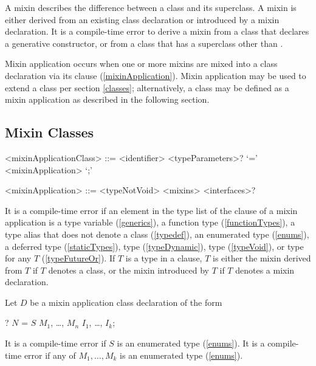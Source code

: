 \documentclass[makeidx]{article}
\begin{document}
\LMHash{}%
A mixin describes the difference between a class and its superclass.
A mixin is either derived from an existing class declaration
or introduced by a mixin declaration.
It is a compile-time error to derive a mixin from
a class that declares a generative constructor,
or from a class that has a superclass other than .

\LMHash{}%
Mixin application occurs when one or more mixins are mixed into
a class declaration via its \WITH{} clause (\ref{mixinApplication}).
Mixin application may be used to extend a class per section \ref{classes};
alternatively, a class may be defined as a mixin application
as described in the following section.


\subsection{Mixin Classes}

\begin{grammar}
<mixinApplicationClass> ::= \gnewline{}
  <identifier> <typeParameters>? `=' <mixinApplication> `;'

<mixinApplication> ::= <typeNotVoid> <mixins> <interfaces>?
\end{grammar}

\LMHash{}%
It is a compile-time error if an element in
the type list of the \WITH{} clause of a mixin application is
a type variable (\ref{generics}),
a function type (\ref{functionTypes}),
a type alias that does not denote a class (\ref{typedef}),
an enumerated type (\ref{enums}),
a deferred type (\ref{staticTypes}),
type \DYNAMIC{} (\ref{typeDynamic}),
type \VOID{} (\ref{typeVoid}),
or type  for any $T$ (\ref{typeFutureOr}).
If $T$ is a type in a \WITH{} clause, 
$T$ is either the mixin derived from $T$ if $T$ denotes a class,
or the mixin introduced by $T$ if $T$ denotes a mixin declaration.

\LMHash{}%
Let $D$ be a mixin application class declaration of the form

\begin{normativeDartCode}
\ABSTRACT? \CLASS{} $N$ = $S$ \WITH{} $M_1$, \ldots, $M_n$ \IMPLEMENTS{} $I_1$, \ldots, $I_k$;
\end{normativeDartCode}

\LMHash{}%
It is a compile-time error if $S$ is an enumerated type (\ref{enums}).
It is a compile-time error if any of $M_1, \ldots, M_k$ is an enumerated type
(\ref{enums}).
\end{document}
